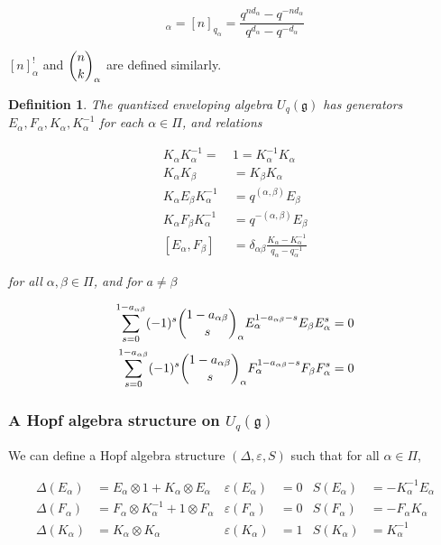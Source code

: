 \documentclass[]{article}
\newtheorem{defn}[theorem]{Definition}
\numberwithin{equation}{subsection}
\begin{document}
        \begin{equation}
            [n]_\alpha = [n]_{q_\alpha} = \frac{q^{nd_\alpha} - q^{-nd_\alpha}}{q^{d_\alpha} - q^{-d_\alpha}}
        \end{equation}

        $[n]_\alpha^!$ and $\dbinom{n}{k}_\alpha$ are defined similarly.

        \begin{defn}
            The quantized enveloping algebra $U_q(\mathfrak{g})$ has generators $E_\alpha, F_\alpha, K_\alpha, K_\alpha^{-1}$ for each $\alpha \in \Pi$, and relations

            \begin{align}
                K_\alpha K_\alpha^{-1} =\ &1  = K_\alpha^{-1}K_\alpha \\
                K_\alpha K_\beta &= K_\beta K_\alpha \\
                K_\alpha E_\beta K_\alpha^{-1} &= q^{(\alpha, \beta)} E_\beta \\
                K_\alpha F_\beta K_\alpha^{-1} &= q^{-(\alpha, \beta)} E_\beta \\
                [E_\alpha, F_\beta] &= \delta_{\alpha\beta} \frac{K_\alpha - K_\alpha^{-1}}{ q_\alpha - q_\alpha^{-1}} 
            \end{align}

            for all $\alpha, \beta \in \Pi$, and for $a \neq \beta$

            \begin{align}
                \sum_{s=0}^{1-a_{\alpha\beta}} (-1)^s \dbinom{1-a_{\alpha\beta}}{s}_\alpha E_\alpha^{1-a_{\alpha\beta} - s} E_\beta E_\alpha^s  &= 0 \\
                \sum_{s=0}^{1-a_{\alpha\beta}} (-1)^s \dbinom{1-a_{\alpha\beta}}{s}_\alpha F_\alpha^{1-a_{\alpha\beta} - s} F_\beta F_\alpha^s  &= 0 
            \end{align}
        \end{defn}
        \subsubsection{A Hopf algebra structure on $U_q(\mathfrak{g})$}

        We can define a Hopf algebra structure $(\Delta, \varepsilon, S)$ such that for all $\alpha \in \Pi$,

        \begin{align}
            \Delta(E_\alpha) &= E_\alpha \otimes 1 + K_\alpha \otimes E_\alpha      & \varepsilon(E_\alpha) &= 0  & S(E_\alpha) &= -K_\alpha^{-1} E_\alpha \\
            \Delta(F_\alpha) &= F_\alpha \otimes K_\alpha^{-1} + 1 \otimes F_\alpha & \varepsilon(F_\alpha) &= 0  & S(F_\alpha) &= -F_\alpha K_\alpha \\
            \Delta(K_\alpha) &= K_\alpha \otimes K_\alpha                           & \varepsilon(K_\alpha) &= 1  & S(K_\alpha) &= K_\alpha^{-1}
        \end{align}
\end{document}
